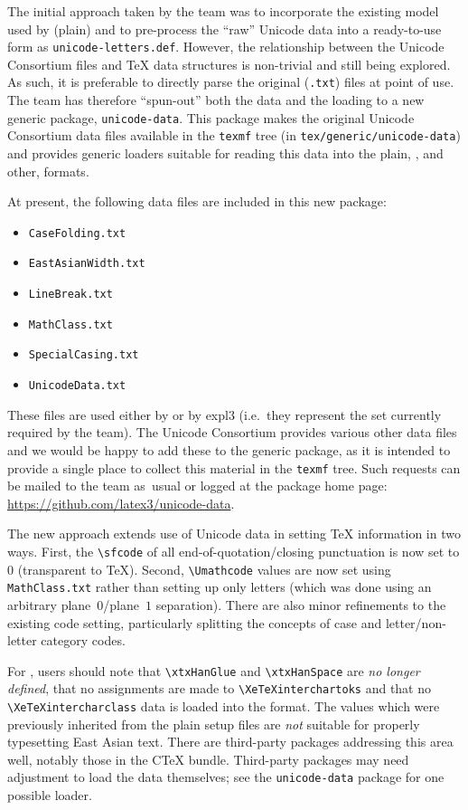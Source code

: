 \documentclass{ltnews}
\providecommand\pkg[1]{\texttt{#1}}
\begin{document}
The initial approach taken by the team was to incorporate the existing model
used by (plain)  and to pre-process the ``raw'' Unicode data into
a ready-to-use form as \verb|unicode-letters.def|. However, the relationship
between the Unicode Consortium files and \TeX{} data structures is non-trivial and still
being explored. As such, it is preferable to directly parse the original
(\verb|.txt|) files at point of use. The team has therefore ``spun-out'' both
the data and the loading to a new generic package, \pkg{unicode-data}. This
package makes the original Unicode Consortium data files available in the
\verb|texmf| tree (in \verb|tex/generic/unicode-data|) and provides generic
loaders suitable for reading this data into the plain, \LaTeXe{}, and other,
formats.

At present, the following data files are included in this new package:
\begin{itemize}\parskip=0pt
  \item \verb|CaseFolding.txt|
  \item \verb|EastAsianWidth.txt|
  \item \verb|LineBreak.txt|
  \item \verb|MathClass.txt|
  \item \verb|SpecialCasing.txt|
  \item \verb|UnicodeData.txt|
\end{itemize}
These files are used either by \LaTeXe{} or by \textsf{expl3}
(i.e.~they represent the set currently required by the team). The
Unicode Consortium provides various other data files and we would be happy to add
these to the generic package, as it is intended to provide a single place
to collect this material in the \verb|texmf| tree. Such requests can be
mailed to the team as~usual or logged at the package home page:
\url{https://github.com/latex3/unicode-data}.

The new approach extends use of Unicode data in setting \TeX{} information in
two ways. First, the \verb|\sfcode| of all end-of-quotation/closing punctuation
is now set to $0$ (transparent to \TeX{}). Second, \verb|\Umathcode| values are
now set using \verb|MathClass.txt| rather than setting up only letters (which
was done using an arbitrary plane~$0$/plane~$1$ separation). There are also
minor refinements to the existing code setting, particularly splitting the
concepts of case and letter/non-letter category codes.

For , users should note that \verb|\xtxHanGlue| and
\verb|\xtxHanSpace| are \emph{no longer defined}, that no assignments are made
to \verb|\XeTeXinterchartoks| and that no \verb|\XeTeXintercharclass| data is
loaded into the format. The values which were previously inherited from
the plain  setup files are \emph{not} suitable for properly
typesetting East Asian text. There are third-party packages addressing this
area well, notably those in the \textsf{CTeX} bundle. Third-party packages
may need adjustment to load the data themselves; see the \pkg{unicode-data}
package for one possible loader.
\end{document}
